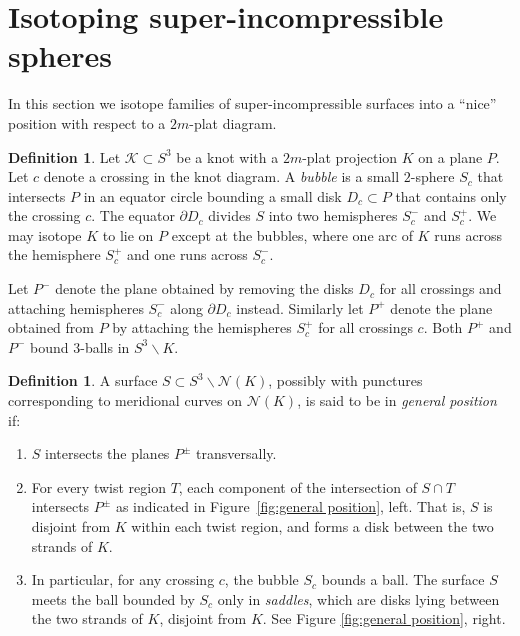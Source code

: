 \documentclass[12pt,reqno]{amsart}
\theoremstyle{plain}
\theoremstyle{definition}
\newtheorem{definition}[theorem]{Definition}
\newcommand{\NN}{\mathcal{N}}
\newcommand{\ssm}{\smallsetminus}
\begin{document}
\section{Isotoping super-incompressible spheres}\label{sec:superincompespheres}

In this section we isotope families of super-incompressible surfaces into 
a ``nice'' position with respect to a $2m$-plat diagram. 

\begin{definition}\label{def:P^_, P^+}
Let $\mathcal{K} \subset S^3$ be a knot with a $2m$-plat  projection $K$ on 
a plane $P$. Let $c$ denote a crossing in the knot diagram. A \emph{bubble} is 
a small $2$-sphere $S_c$ that intersects $P$ in an equator circle bounding a small 
disk $D_c \subset P$ that contains only the crossing $c$. The equator 
$\partial D_c$ divides  $S$ into two hemispheres $S_c^-$ and $S_c^+$.  
We may isotope $K$ to lie on $P$ except at the bubbles, where one arc 
of $K$ runs across the hemisphere $S_c^+$ and one runs across $S_c^-$. 

Let $P^-$ denote the plane obtained by removing the disks $D_c$ for all crossings
and attaching hemispheres $S^-_c$ along $\partial D_c$ instead. Similarly let $P^+$
denote the plane obtained from $P$ by attaching the hemispheres $S^+_c$ for
all crossings $c$. Both $P^+$ and $P^-$ bound $3$-balls in $S^3 \ssm K$.
\end{definition}

\begin{definition}\label{def:general position}
A surface $S \subset S^3 \ssm \NN(K)$, possibly with punctures corresponding to
meridional curves on $\NN(K)$, is said to be in \emph{general position} if:
\begin{enumerate}
\item $S$ intersects the planes  $P^\pm$ transversally.

\item For every twist region $T$, each component of the intersection of 
$S\cap T$ intersects $P^\pm$ as indicated in Figure~\ref{fig:general position},
left. That is, $S$ is disjoint from $K$ within each twist region, and forms a disk
between the two strands of $K$. 

\item In particular, for any crossing $c$, the bubble $S_c$ bounds a ball. The surface 
$S$ meets the ball bounded by $S_c$ only in \emph{saddles}, which are 
disks lying between the two strands of $K$, disjoint from $K$. See 
Figure \ref{fig:general position}, right.
\end{enumerate}
\end{definition}
\end{document}
